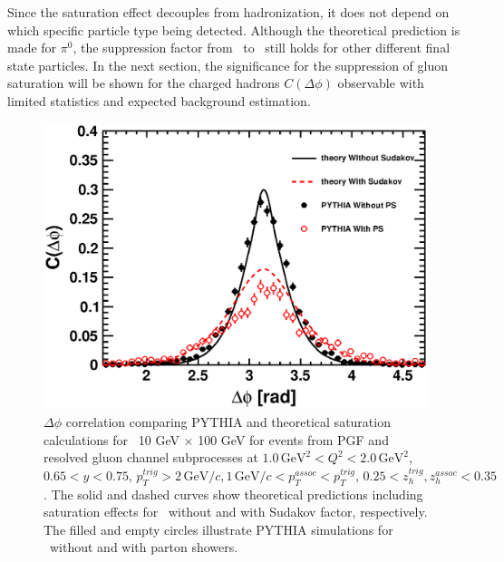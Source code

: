 Since the saturation effect decouples from hadronization, it does not
depend on which specific particle type being detected. Although the theoretical
prediction is made for $\pi^{0}$, the suppression factor from \ep\ to \eA\
still holds for other different final state particles. In the next section, the
significance for the suppression of gluon saturation will be shown for the
charged hadrons $C(\Delta\phi)$ observable with limited statistics and
expected background estimation.
\begin{figure} 
\begin{center}
\includegraphics[width=1.0\textwidth]{plots/chpt6/ep_10x100_Q2_1_y_0.7_theory_MC_compare_as_0.35.eps} 
\end{center} 
\caption[Comparison of \ep\ dihadron correlation function from PYTHIA and theoretical prediction with or without Sudakov effect]
{\pion $\Delta\phi$ correlation comparing PYTHIA and theoretical saturation calculations
for \ep\ 10 GeV $\times$ 100 GeV for events from PGF and resolved gluon channel subprocesses
 at $1.0 \, \mathrm{GeV}^{2} < Q^{2} < 2.0 \, \mathrm{GeV}^{2}$, \, $0.65 < y < 0.75, \, p_{T}^{trig} > 2 \,
\mathrm{GeV/}c, 1 \, \mathrm{GeV/}c < p_{T}^{assoc} < p_{T}^{trig}, \,0.25 <
z_{h}^{trig}, z_{h}^{assoc} < 0.35$. The solid and dashed curves show theoretical predictions including 
saturation effects for \ep\ without and with Sudakov factor, respectively. 
The filled and empty circles illustrate PYTHIA simulations for \ep\ without and with parton showers. }
\label{fig:epCompareWithSud} 
\end{figure}



